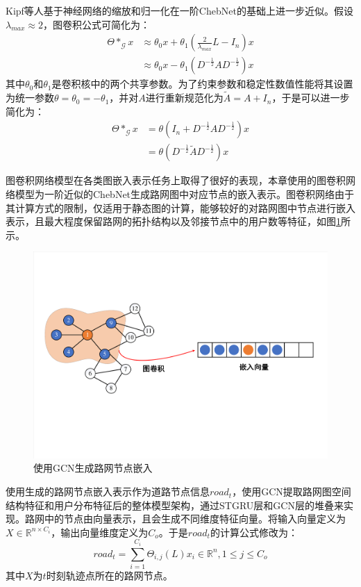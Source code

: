 \documentclass[master]{thesis-uestc}
\begin{document}
Kipf等人基于神经网络的缩放和归一化在一阶ChebNet的基础上进一步近似。假设$\lambda_{max}\approx 2$，图卷积公式可简化为：
\begin{align}
\Theta \ast_{\mathcal{G}} x & \approx \theta_0 x + \theta_1 (\frac{2}{\lambda_{max}}L-I_n)x\\
&\approx \theta_0 x - \theta_1(D^{-\frac{1}{2}}AD^{-\frac{1}{2}})x
\end{align}
其中$\theta_0$和$\theta_1$是卷积核中的两个共享参数。为了约束参数和稳定性数值性能将其设置为统一参数$\theta=\theta_0=-\theta_1$，并对$A$进行重新规范化为$\tilde{A}=A+I_n$，于是可以进一步简化为：
\begin{align}
\Theta \ast_{\mathcal{G}} x &= \theta(I_n+D^{-\frac{1}{2}}AD^{-\frac{1}{2}})x\\
&= \theta(D^{-\frac{1}{2}}\tilde{A}D^{-\frac{1}{2}})x
\end{align}

图卷积网络模型在各类图嵌入表示任务上取得了很好的表现，本章使用的图卷积网络模型为一阶近似的ChebNet生成路网图中对应节点的嵌入表示。图卷积网络由于其计算方式的限制，仅适用于静态图的计算，能够较好的对路网图中节点进行嵌入表示，且最大程度保留路网的拓扑结构以及邻接节点中的用户数等特征，如图\ref{Figure.4.2.3}所示。
\begin{figure}[!ht]
\centering
\includegraphics[scale=0.2]{./pic/gcn.pdf}
\caption{使用GCN生成路网节点嵌入}
\label{Figure.4.2.3}
\end{figure}

使用生成的路网节点嵌入表示作为道路节点信息$road_t$，使用GCN提取路网图空间结构特征和用户分布特征后的整体模型架构，通过STGRU层和GCN层的堆叠来实现。路网中的节点由向量表示，且会生成不同维度特征向量。将输入向量定义为$X\in \mathbb{R}^{n \times C_i}$，输出向量维度定义为$C_o$。于是$road_t$的计算公式修改为：
\begin{equation}
   road_t = \sum\limits_{i=1}^{C_i} \Theta_{i,j}(L)x_i \in \mathbb{R}^n, 1 \leqslant j \leqslant C_o
\end{equation}
其中$X$为$t$时刻轨迹点所在的路网节点。
\end{document}
